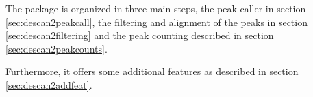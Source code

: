 The package is organized in three main steps, the peak caller in section \ref{sec:descan2peakcall}, the filtering and alignment of the peaks in section \ref{sec:descan2filtering} and the peak counting described in section \ref{sec:descan2peakcounts}.

Furthermore, it offers some additional features as described in section \ref{sec:descan2addfeat}.


